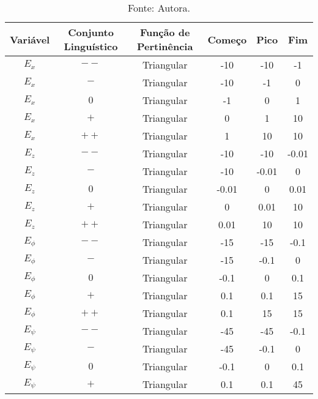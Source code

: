 \vspace{-0.5cm}
\begin{center}
    \begin{longtable}{|c|c|c|c|c|c|} %
        \caption{Funções de Pertinência} \vspace{-0.4cm}
        \label{tab:func_pert}
        \hline
        Variável & Conjunto Linguístico & Função de Pertinência & Começo & Pico & Fim \\
        \hline
        \endfirsthead
        \endhead
        \endfoot
        \caption*{\footnotesize{Fonte: Autora.}} \vspace{-0.55cm}
        \endlastfoot

        $E_x$ & $--$ & Triangular & -10 & -10 & -1 \\
        $E_x$ & $-$  & Triangular & -10 & -1 & 0 \\
        $E_x$ & $0$  & Triangular & -1 & 0 & 1 \\
        $E_x$ & $+$  & Triangular & 0 & 1 & 10 \\
        $E_x$ & $++$ & Triangular & 1 & 10 & 10 \\
        \hline
        $E_{z}$ & $--$ & Triangular & -10 & -10 & -0.01 \\
        $E_{z}$ & $-$  & Triangular & -10 & -0.01 & 0 \\
        $E_{z}$ & $0$  & Triangular & -0.01 & 0 & 0.01 \\
        $E_{z}$ & $+$  & Triangular & 0 & 0.01 & 10 \\
        $E_{z}$ & $++$ & Triangular & 0.01 & 10 & 10 \\
        \hline
        $E_{\phi}$ & $--$ & Triangular & -15 & -15 & -0.1 \\
        $E_{\phi}$ & $-$  & Triangular & -15 & -0.1 & 0 \\
        $E_{\phi}$ & $0$  & Triangular & -0.1 & 0 & 0.1 \\
        $E_{\phi}$ & $+$  & Triangular & 0.1 & 0.1 & 15 \\
        $E_{\phi}$ & $++$ & Triangular & 0.1 & 15 & 15 \\
        \hline
        $E_{\psi}$ & $--$ & Triangular & -45 & -45 & -0.1 \\
        $E_{\psi}$ & $-$  & Triangular & -45 & -0.1 & 0 \\
        $E_{\psi}$ & $0$  & Triangular & -0.1 & 0 & 0.1 \\
        $E_{\psi}$ & $+$  & Triangular & 0.1 & 0.1 & 45 \\

\end{longtable}
\end{center}
